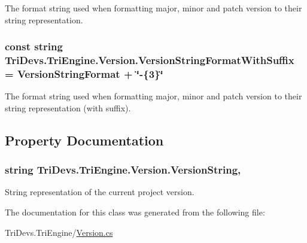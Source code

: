 The format string used when formatting major, minor and patch version to their string representation. 

\hypertarget{class_tri_devs_1_1_tri_engine_1_1_version_a808466c057e2e39b3ef143ea1d94ec4b}{
\subsubsection[{Version\-String\-Format\-With\-Suffix}]{\setlength{\rightskip}{0pt plus 5cm}const string Tri\-Devs.\-Tri\-Engine.\-Version.\-Version\-String\-Format\-With\-Suffix = {\bf Version\-String\-Format} + \char`\"{}-\/\{3\}\char`\"{}}}\label{class_tri_devs_1_1_tri_engine_1_1_version_a808466c057e2e39b3ef143ea1d94ec4b}


The format string used when formatting major, minor and patch version to their string representation (with suffix). 



\subsection{Property Documentation}
\hypertarget{class_tri_devs_1_1_tri_engine_1_1_version_ac673598a246291c8d7e8741cc9657db4}{
\subsubsection[{Version\-String}]{\setlength{\rightskip}{0pt plus 5cm}string Tri\-Devs.\-Tri\-Engine.\-Version.\-Version\-String\hspace{0.3cm}{\ttfamily [static]}, {\ttfamily [get]}}}\label{class_tri_devs_1_1_tri_engine_1_1_version_ac673598a246291c8d7e8741cc9657db4}


String representation of the current project version. 



The documentation for this class was generated from the following file\-:\begin{DoxyCompactItemize}
\item 
Tri\-Devs.\-Tri\-Engine/\hyperlink{_version_8cs}{Version.\-cs}\end{DoxyCompactItemize}
